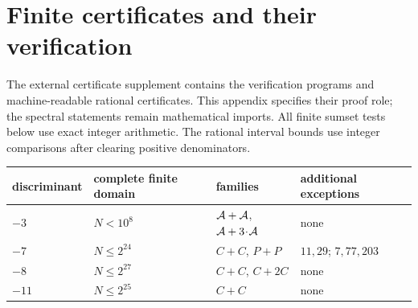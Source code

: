 \section{Finite certificates and their verification}\label{app:verifier}

The external certificate supplement contains the verification programs
and machine-readable rational certificates. This appendix specifies their
proof role; the spectral statements remain mathematical imports.
All finite sumset tests below use exact integer arithmetic.  The
rational interval bounds use integer comparisons after clearing positive
denominators.

\begin{center}\small
\begin{tabular}{llll}
\toprule
discriminant&complete finite domain&families&additional exceptions\\\midrule
$-3$&$N<10^8$&$\AA+\AA$, $\AA+3\!\cdot\!\AA$&none\\
$-7$&$N\le2^{24}$&$C+C$, $P+P$&$11,29$; $7,77,203$\\
$-8$&$N\le2^{27}$&$C+C$, $C+2C$&none\\
$-11$&$N\le2^{25}$&$C+C$&none\\
\bottomrule
\end{tabular}
\end{center}

